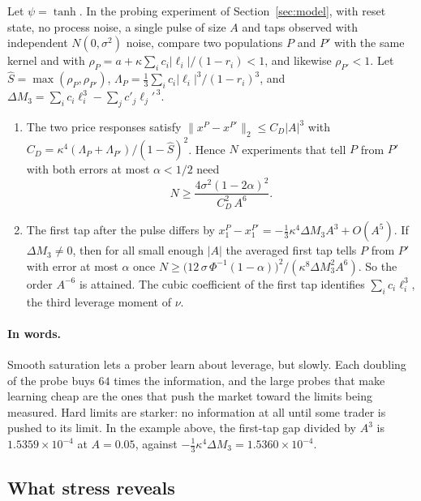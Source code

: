 \begin{proposition}\label{prop:smooth}
Let $\psi=\tanh$. In the probing experiment of Section~\ref{sec:model}, with reset state, no process noise, a single pulse of size $A$ and taps observed with independent $N(0,\sigma^2)$ noise, compare two populations $P$ and $P'$ with the same kernel and with $\rho_P=a+\kappa\sum_ic_i|\ell_i|/(1-r_i)<1$, and likewise $\rho_{P'}<1$. Let $\hat S=\max(\rho_P,\rho_{P'})$, $\Lambda_P=\tfrac13\sum_ic_i|\ell_i|^3/(1-r_i)^3$, and $\Delta M_3=\sum_ic_i\ell_i^3-\sum_jc'_j\ell_j'^{\,3}$.
\begin{enumerate}[label=(\roman*),itemsep=1pt]
\item The two price responses satisfy $\|x^P-x^{P'}\|_2\le C_D|A|^3$ with $C_D=\kappa^4(\Lambda_P+\Lambda_{P'})/(1-\hat S)^2$. Hence $N$ experiments that tell $P$ from $P'$ with both errors at most $\alpha<1/2$ need
\[
 N\ge\frac{4\sigma^2(1-2\alpha)^2}{C_D^2\,A^6}.
\]
\item The first tap after the pulse differs by $x_1^P-x_1^{P'}=-\tfrac13\kappa^4\Delta M_3A^3+O(A^5)$. If $\Delta M_3\ne0$, then for all small enough $|A|$ the averaged first tap tells $P$ from $P'$ with error at most $\alpha$ once $N\ge\bigl(12\,\sigma\,\Phi^{-1}(1-\alpha)\bigr)^2/(\kappa^8\Delta M_3^2A^6)$. So the order $A^{-6}$ is attained. The cubic coefficient of the first tap identifies $\sum_ic_i\ell_i^3$, the third leverage moment of $\nu$.
\end{enumerate}
\end{proposition}


\paragraph{In words.} Smooth saturation lets a prober learn about leverage, but slowly. Each doubling of the probe buys $64$ times the information, and the large probes that make learning cheap are the ones that push the market toward the limits being measured. Hard limits are starker: no information at all until some trader is pushed to its limit. In the example above, the first-tap gap divided by $A^3$ is $1.5359\times10^{-4}$ at $A=0.05$, against $-\tfrac13\kappa^4\Delta M_3=1.5360\times10^{-4}$.


\subsection{What stress reveals}

